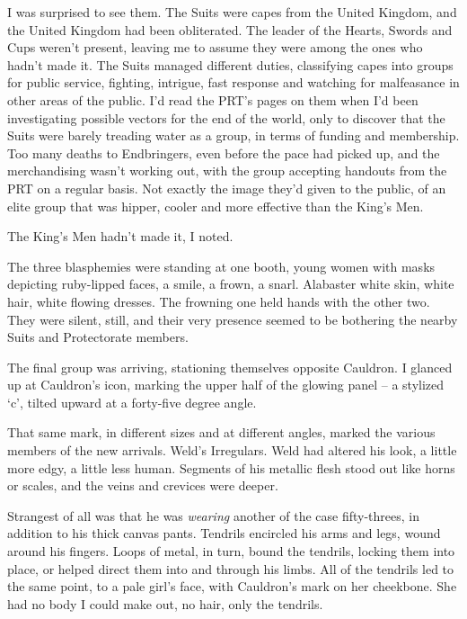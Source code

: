 I was surprised to see them.  The Suits were capes from the United Kingdom, and the United Kingdom had been obliterated.  The leader of the Hearts, Swords and Cups weren't present, leaving me to assume they were among the ones who hadn't made it.  The Suits managed different duties, classifying capes into groups for public service, fighting, intrigue, fast response and watching for malfeasance in other areas of the public.  I'd read the PRT's pages on them when I'd been investigating possible vectors for the end of the world, only to discover that the Suits were barely treading water as a group, in terms of funding and membership.  Too many deaths to Endbringers, even before the pace had picked up, and the merchandising wasn't working out, with the group accepting handouts from the PRT on a regular basis.  Not exactly the image they'd given to the public, of an elite group that was hipper, cooler and more effective than the King's Men.



The King's Men hadn't made it, I noted.



The three blasphemies were standing at one booth, young women with masks depicting ruby-lipped faces, a smile, a frown, a snarl.  Alabaster white skin, white hair, white flowing dresses.  The frowning one held hands with the other two.  They were silent, still, and their very presence seemed to be bothering the nearby Suits and Protectorate members.



The final group was arriving, stationing themselves opposite Cauldron.  I glanced up at Cauldron's icon, marking the upper half of the glowing panel – a stylized `c', tilted upward at a forty-five degree angle.



That same mark, in different sizes and at different angles, marked the various members of the new arrivals.  Weld's Irregulars.  Weld had altered his look, a little more edgy, a little less human.  Segments of his metallic flesh stood out like horns or scales, and the veins and crevices were deeper.



Strangest of all was that he was \emph{wearing} another of the case fifty-threes, in addition to his thick canvas pants.  Tendrils encircled his arms and legs, wound around his fingers.  Loops of metal, in turn, bound the tendrils, locking them into place, or helped direct them into and through his limbs.  All of the tendrils led to the same point, to a pale girl's face, with Cauldron's mark on her cheekbone.  She had no body I could make out, no hair, only the tendrils.



